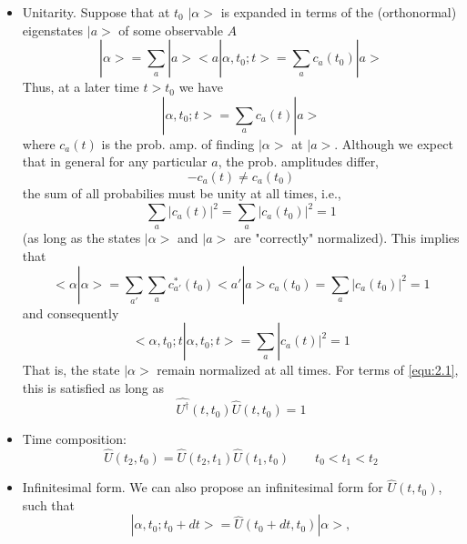 \begin{itemize}
  \item Unitarity. Suppose that at $t_0$ $|\alpha>$ is
    expanded in terms of the (orthonormal) eigenstates $|a>$
    of some observable $A$
    \begin{equation}
      |\alpha> = \sum_a |a><a|\alpha,t_0;t> = \sum_a
      c_a(t_0)|a>
      \label{equ:2.2}
    \end{equation}
    Thus, at a later time $t > t_0$ we have
    \begin{equation}
      |\alpha,t_0;t> = \sum_a c_a(t) |a>
      \label{equ:2.3}
    \end{equation}
    where $c_a(t)$ is the prob. amp. of finding $|\alpha>$
    at $|a>$.
    Although we expect that in general for any particular
    $a$, the prob. amplitudes differ,
    $$-
      c_a(t) \neq c_a(t_0)
    $$
    the sum of all probabilies must be unity at all times,
    i.e.,
    \begin{equation}
      \sum_a |c_a(t)|^2 = \sum_a |c_a(t_0)|^2 = 1
      \label{equ:2.4}
    \end{equation}
    (as long as the states $|\alpha>$ and $|a>$ are
    "correctly" normalized).
    This implies that
    \begin{equation}
      <\alpha|\alpha> = \sum_{a'} \sum_a c_{a'}^*(t_0)
      <a'|a>  c_a(t_0) = \sum_a |c_a(t_0)|^2 = 1
      \label{equ:2.5}
    \end{equation}
    and consequently
    \begin{equation}
      <\alpha,t_0;t|\alpha,t_0;t> = \sum_a |c_a(t)|^2 = 1
      \label{equ:2.6}
    \end{equation}
    That is, the state $|\alpha>$ remain normalized at all
    times. For terms of \ref{equ:2.1}, this is satisfied as
    long as
    \begin{equation}
      \hat{U^\dagger}(t, t_0) \hat{U}(t,t_0) = 1
      \label{equ:2.7}
    \end{equation}
  \item Time composition:
    \begin{equation}
      \hat{U}(t_2,t_0) = \hat{U}(t_2,t_1) \hat{U}(t_1,t_0)
      \qquad t_0 < t_1 < t_2
      \label{equ:2.8}
    \end{equation}
  \item Infinitesimal form. We can also propose an
    infinitesimal form for $\hat{U}(t,t_0)$, such that
    \begin{equation}
      |\alpha,t_0;t_0 + dt> = \hat{U}(t_0+dt,t_0) |\alpha>,

\end{equation}
\end{itemize}
